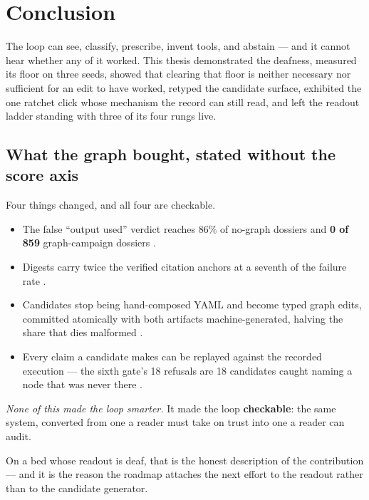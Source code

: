 \chapter{Conclusion}
\label{ch:conclusion}

The loop can see, classify, prescribe, invent tools, and abstain --- and it
cannot hear whether any of it worked. This thesis demonstrated the
deafness, measured its floor on three seeds, showed that clearing that
floor is neither necessary nor sufficient for an edit to have worked,
retyped the candidate surface, exhibited the one ratchet click whose
mechanism the record can still read, and left the readout ladder standing
with three of its four rungs live.

\section*{What the graph bought, stated without the score axis}

Four things changed, and all four are checkable.

\begin{itemize}
  \item The false ``output used'' verdict reaches $86\%$ of no-graph
        dossiers and \textbf{0 of 859} graph-campaign dossiers
        .
  \item Digests carry twice the verified citation anchors at a seventh of
        the failure rate .
  \item Candidates stop being hand-composed YAML and become typed graph
        edits, committed atomically with both artifacts machine-generated,
        halving the share that dies malformed .
  \item Every claim a candidate makes can be replayed against the recorded
        execution --- the sixth gate's 18 refusals are 18 candidates caught
        naming a node that was never there .
\end{itemize}

\emph{None of this made the loop smarter.} It made the loop
\textbf{checkable}: the same system, converted from one a reader must take
on trust into one a reader can audit.

On a bed whose readout is deaf, that is the honest description of the
contribution --- and it is the reason the roadmap attaches the next effort
to the readout rather than to the candidate generator.

